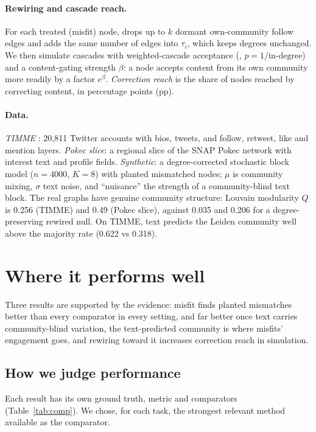 \paragraph{Rewiring and cascade reach.}
For each treated (misfit) node,  drops up to $k$ dormant own-community follow edges and adds the same number of edges into $\tau_i$, which keeps degrees unchanged. We then simulate cascades with weighted-cascade acceptance (, $p{=}1/\text{in-degree}$) \cite{kempe2003influence} and a content-gating strength $\beta$: a node accepts content from its own community more readily by a factor $e^{\beta}$. \emph{Correction reach} is the share of nodes reached by correcting content, in percentage points (pp).

\paragraph{Data.}
\emph{TIMME} \cite{xiao2020timme}: 20{,}811 Twitter accounts with bios, tweets, and follow, retweet, like and mention layers. \emph{Pokec slice}: a regional slice of the SNAP Pokec network \cite{snap} with interest text and profile fields. \emph{Synthetic}: a degree-corrected stochastic block model ($n{=}4000$, $K{=}8$) with planted mismatched nodes; $\mu$ is community mixing, $\sigma$ text noise, and ``nuisance'' the strength of a community-blind text block. The real graphs have genuine community structure: Louvain modularity $Q$ is 0.256 (TIMME) and 0.49 (Pokec slice), against 0.035 and 0.206 for a degree-preserving rewired null. On TIMME, text predicts the Leiden community well above the majority rate (0.622 vs 0.318).

\section{Where it performs well}
\label{sec:perform}
Three results are supported by the evidence: misfit finds planted mismatches better than every comparator in every setting, and far better once text carries community-blind variation, the text-predicted community is where misfits' engagement goes, and rewiring toward it increases correction reach in simulation.

\subsection{How we judge performance}
\label{sec:judge}
Each result has its own ground truth, metric and comparators (Table~\ref{tab:comp}). We chose, for each task, the strongest relevant method available as the comparator.

